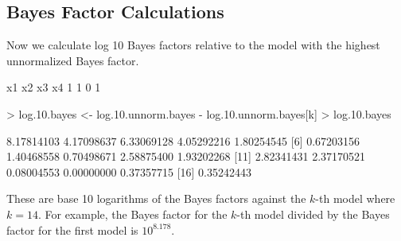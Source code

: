 \documentclass[11pt]{article}
\begin{document}
\subsection{Bayes Factor Calculations}

Now we calculate log 10 Bayes factors relative to the model with the highest
unnormalized Bayes factor.
\begin{Schunk}
\begin{Soutput}
x1 x2 x3 x4 
 1  1  0  1 
\end{Soutput}
\begin{Sinput}
> log.10.bayes <- log.10.unnorm.bayes - log.10.unnorm.bayes[k]
> log.10.bayes
\end{Sinput}
\begin{Soutput}
 [1] 8.17814103 4.17098637 6.33069128 4.05292216 1.80254545
 [6] 0.67203156 1.40468558 0.70498671 2.58875400 1.93202268
[11] 2.82341431 2.37170521 0.08004553 0.00000000 0.37357715
[16] 0.35242443
\end{Soutput}
\end{Schunk}
These are base 10 logarithms of the Bayes factors against the $k$-th
model where $k = 14$.  For example, the Bayes factor for the $k$-th
model divided by the Bayes factor for the first model is
$10^{8.178}$.
\end{document}

